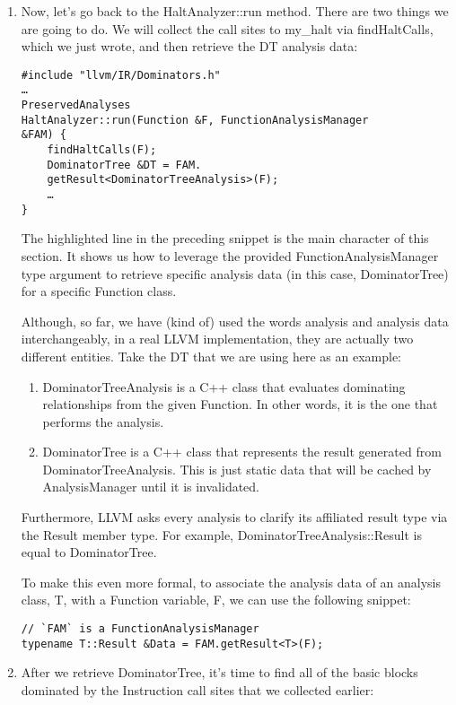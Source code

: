 \begin{enumerate}
\item Now, let's go back to the HaltAnalyzer::run method. There are two things we are going to do. We will collect the call sites to my\_halt via findHaltCalls, which we just wrote, and then retrieve the DT analysis data:

\begin{lstlisting}[style=styleCXX]
#include "llvm/IR/Dominators.h"
…
PreservedAnalyses
HaltAnalyzer::run(Function &F, FunctionAnalysisManager
&FAM) {
	findHaltCalls(F);
	DominatorTree &DT = FAM.
	getResult<DominatorTreeAnalysis>(F);
	…
}
\end{lstlisting}

The highlighted line in the preceding snippet is the main character of this section. It shows us how to leverage the provided FunctionAnalysisManager type argument to retrieve specific analysis data (in this case, DominatorTree) for a specific Function class.

Although, so far, we have (kind of) used the words analysis and analysis data interchangeably, in a real LLVM implementation, they are actually two different entities. Take the DT that we are using here as an example:

\begin{enumerate}[label=\alph*)]
\item DominatorTreeAnalysis is a C++ class that evaluates dominating relationships from the given Function. In other words, it is the one that performs the analysis.

\item DominatorTree is a C++ class that represents the result generated from
DominatorTreeAnalysis. This is just static data that will be cached by AnalysisManager until it is invalidated. 

\end{enumerate}

Furthermore, LLVM asks every analysis to clarify its affiliated result type via the Result member type. For example, DominatorTreeAnalysis::Result is
equal to DominatorTree. 

To make this even more formal, to associate the analysis data of an analysis class, T, with a Function variable, F, we can use the following snippet:

\begin{lstlisting}[style=styleCXX]
// `FAM` is a FunctionAnalysisManager
typename T::Result &Data = FAM.getResult<T>(F);
\end{lstlisting}

\item After we retrieve DominatorTree, it's time to find all of the basic blocks dominated by the Instruction call sites that we collected earlier:


\end{enumerate}
